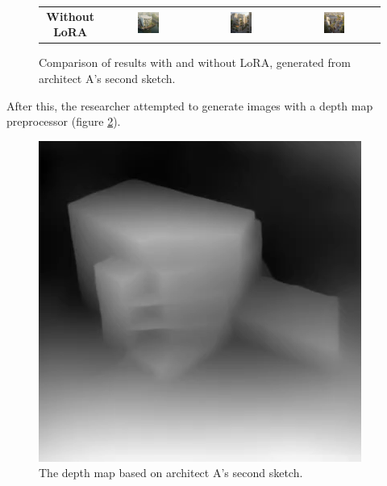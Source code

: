 \begin{figure}[H]
{\begin{tabular}{c c c c}
    \textbf{Without LoRA} &
    \includegraphics[width=0.25\textwidth]{Images/Results/Architect-A_unstructured-phase/generated_images/2/Zonder_lora_00008_.png} &
    \includegraphics[width=0.25\textwidth]{Images/Results/Architect-A_unstructured-phase/generated_images/2/Zonder_lora_00012_.png} & \includegraphics[width=0.25\textwidth]{Images/Results/Architect-A_unstructured-phase/generated_images/2/Zonder_lora_00013_.png} \\
  \end{tabular}
  }
  \caption{Comparison of results with and without LoRA, generated from architect A's second sketch.}
  \label{fig:lora-comparison-2wide}
\end{figure}
After this, the researcher attempted to generate images with a depth map preprocessor (figure \ref{fig:depth map}).
\begin{figure}[H]
    \centering
    \includegraphics[width=0.3\linewidth]{Images/Results/Architect-A_unstructured-phase/sketches/sketch_2_preprocessed_2.png}
    \caption{The depth map based on architect A's second sketch.}
    \label{fig:depth map}
\end{figure}

